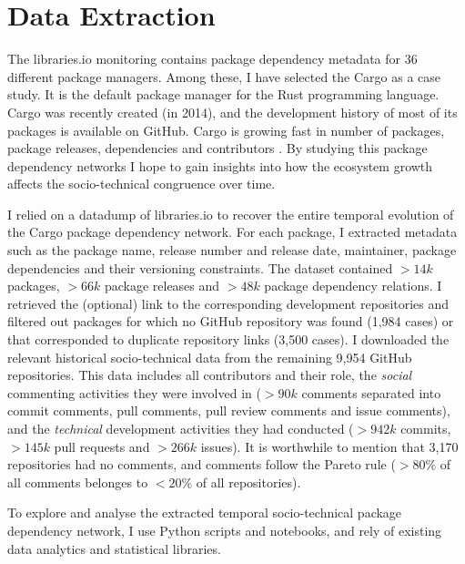 \section{Data Extraction}

The \textsf{libraries.io} monitoring contains package dependency metadata for 36 different package managers.
Among these, I have selected the Cargo as a case study. It is the default package manager for %
the Rust programming language. Cargo was recently created (in 2014), and the development history of most of its packages is available on GitHub. 
Cargo is growing fast in number of packages, package releases, dependencies and contributors \cite{Decan2019EMSE}. 
By studying this package dependency networks I hope to gain insights into how the ecosystem growth affects the socio-technical congruence over time.

I relied on a datadump of libraries.io \cite{Katz2018} to recover the entire temporal evolution of the Cargo package dependency network. 
For each package, I extracted metadata such as the package name, release number and release date, maintainer, package dependencies and their versioning constraints. 
The dataset contained $>14k$ packages, $>66k$ package releases and $>48k$ package dependency relations.
I retrieved the (optional) link to the corresponding development repositories and filtered out packages for which no GitHub repository was found (1,984 cases) %
or that corresponded to duplicate repository links (3,500 cases).
I downloaded the relevant historical socio-technical data from the remaining 9,954 GitHub repositories.
This data includes all contributors and their role, the \emph{social} commenting activities they were involved in ($>90k$ comments separated into commit comments, pull comments, pull review comments and issue comments), and the \emph{technical} development activities they had conducted ($>942k$ commits, $>145k$ pull requests and $>266k$ issues).
It is worthwhile to mention that 3,170 repositories had no comments, and comments follow the Pareto rule ($>80\%$ of all comments belonges to $<20\%$ of all repositories).

To explore and analyse the extracted temporal socio-technical package dependency network, I use Python scripts and notebooks, and rely of existing data analytics and statistical libraries.

